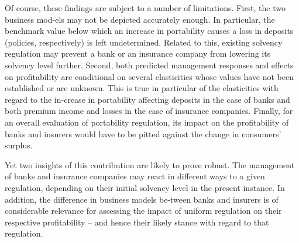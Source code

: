 Of course, these findings are subject to a number of limitations. First, the two business mod-els may not be depicted accurately enough. In particular, the benchmark value below which an increase in portability causes a loss in deposits (policies, respectively) is left undetermined.  Related to this, existing solvency regulation may prevent a bank or an insurance company from lowering its solvency level further. Second, both predicted management responses and effects on profitability are conditional on several elasticities whose values have not been established or are unknown. This is true in particular of the elasticities with regard to the in-crease in portability affecting deposits in the case of banks and both premium income and losses in the case of insurance companies. Finally, for an overall evaluation of portability regulation, its impact on the profitability of banks and insurers would have to be pitted against the change in consumers' surplus.


Yet two insights of this contribution are likely to prove robust. The management of banks and insurance companies may react in different ways to a given regulation, depending on their initial solvency level in the present instance. In addition, the difference in business models be-tween banks and insurers is of considerable relevance for assessing the impact of uniform regulation on their respective profitability – and hence their likely stance with regard to that regulation.
